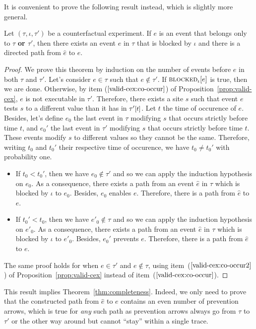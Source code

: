 It is convenient to prove the following result instead, which is
slightly more general.

\smallskip

\begin{theorem*} Let $(\tau, \iota, \tau')$ be a counterfactual
  experiment. If $e$ is an event that belongs only to $\tau$
  \textbf{or $\tau'$}, then there exists an event $\hat e$ in
  $\tau$ that is blocked by $\iota$ and there is a directed path 
  from $\hat e$ to $e$.
\end{theorem*}

\begin{proof}
  We prove this theorem by induction on the number of events before
  $e$ in both $\tau$ and $\tau'$. Let's consider $e \in \tau$ such
  that $e \notin \tau'$. If ${\textsc{blocked}}_{\iota}[e]$ is true, then we are
  done. Otherwise, by item ($\ref{valid-cex:co-occur}$) of
  Proposition~\ref{prop:valid-cex}, $e$ is not executable in
  $\tau'$. Therefore, there exists a site $s$ such that event $e$
  tests $s$ to a different value than it has in $\TSTATE{t}{\tau'}$.
  Let $t$ the time of occurence of $e$.  Besides, let's define $e_0$
  the last event in $\tau$ modifying $s$ that occurs strictly before
  time $t$, and $e_0'$ the last event in $\tau'$ modifying $s$ that
  occurs strictly before time $t$. These events modify $s$ to
  different values so they cannot be the same. Therefore, writing
  $t_0$ and $t_0'$ their respective time of occurence, we have
  $t_0 \neq t_0'$ with probability one.

  \begin{itemize}
  \item If $t_0 < t_0'$, then we have $e_0 \notin \tau'$
    and so we can apply the induction hypothesis on $e_0$. As a
    consequence, there exists a path from an event $\hat e$ in $\tau$
    which is blocked by $\iota$ to $e_0$. Besides, $e_0$ enables
    $e$. Therefore, there is a path from $\hat e$ to $e$.
  \item If $t_0' < t_0$, then we have $e'_0 \notin \tau$
    and so we can apply the induction hypothesis on $e'_0$. As a
    consequence, there exists a path from an event $\hat e$ in $\tau$
    which is blocked by $\iota$ to $e'_0$. Besides, $e_0'$ prevents
    $e$. Therefore, there is a path from $\hat e$ to $e$.
  \end{itemize}
  The same proof holds for when $e \in \tau'$ and $e \notin \tau$,
  using item~($\ref{valid-cex:co-occur2}$) of
  Proposition~\ref{prop:valid-cex} instead of
  item~($\ref{valid-cex:co-occur}$).
\end{proof}
This result implies Theorem~\ref{thm:completeness}. Indeed, we only
need to prove that the constructed path from $\hat e$ to $e$ contains
an even number of prevention arrows, which is true for \textit{any}
such path as prevention arrows always go from $\tau$ to $\tau'$ or the
other way around but cannot ``stay'' within a single trace.
